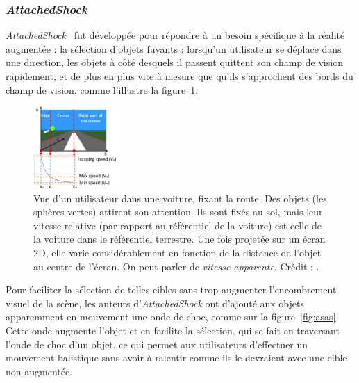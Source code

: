 	\subsubsection{\emph{AttachedShock}}
	\emph{AttachedShock}~\cite{you2012attachedshock, you2014attachedshock} fut développée pour répondre à un besoin spécifique à la réalité augmentée : la sélection d'objets \og fuyants \fg{} : lorsqu'un utilisateur se déplace dans une direction, les objets à côté desquels il passent quittent son champ de vision rapidement, et de plus en plus vite à mesure que qu'ils s'approchent des bords du champ de vision, comme l'illustre la figure~\ref{fig:as2dspeed}.

	\begin{figure}
		\includegraphics[width=0.28\textwidth]{figures/ch2/as2dspeed}
		\caption[\emph{AttachedShock}, profil de vitesse]{Vue d'un utilisateur dans une voiture, fixant la route. Des objets (les sphères vertes) attirent son attention. Ils sont fixés au sol, mais leur vitesse relative (par rapport au référentiel de la voiture) est celle de la voiture dans le référentiel terrestre. Une fois projetée sur un écran 2D, elle varie considérablement en fonction de la distance de l'objet au centre de l'écran. On peut parler de \emph{vitesse apparente}. Crédit : \cite{you2012attachedshock}.}
		\label{fig:as2dspeed}	
	\end{figure}
	
	Pour faciliter la sélection de telles cibles sans trop augmenter l'encombrement visuel de la scène, les auteurs d'\emph{AttachedShock} ont d'ajouté aux objets apparemment en mouvement une onde de choc, comme sur la figure~\ref{fig:asas}. Cette onde augmente l'objet et en facilite la sélection, qui se fait en \og traversant \fg{} l'onde de choc d'un objet, ce qui permet aux utilisateurs d'effectuer un mouvement balistique sans avoir à ralentir comme ils le devraient avec une cible non augmentée.
	
